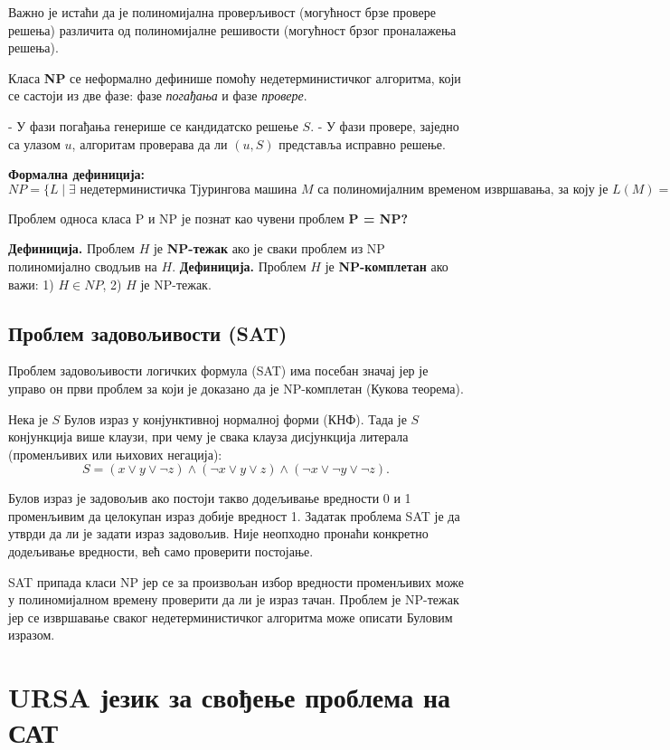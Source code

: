 \documentclass[12pt,oneside]{memoir}
\begin{document}
Важно је истаћи да је полиномијална проверљивост (могућност брзе провере решења) различита од полиномијалне решивости (могућност брзог проналажења решења).  

Класа \textbf{NP} се неформално дефинише помоћу недетерминистичког алгоритма, који се састоји из две фазе: фазе \textit{погађања} и фазе \textit{провере}.  

- У фази погађања генерише се кандидатско решење $S$.  
- У фази провере, заједно са улазом $u$, алгоритам проверава да ли $(u,S)$ представља исправно решење.  

\textbf{Формална дефиниција:}
\[
NP = \{ L \mid \exists \text{ недетерминистичка Тјурингова машина } M \text{ са полиномијалним временом извршавања, за коју је } L(M) = L \}.
\]

Проблем односа класа P и NP је познат као чувени проблем \textbf{P = NP?}  

\textbf{Дефиниција.} Проблем $H$ је \textbf{NP-тежак} ако је сваки проблем из NP полиномијално сводљив на $H$.  
\textbf{Дефиниција.} Проблем $H$ је \textbf{NP-комплетан} ако важи:  
1) $H \in NP$,  
2) $H$ је NP-тежак.  

\subsection{Проблем задовољивости (SAT)}
Проблем задовољивости логичких формула (SAT) има посебан значај јер је управо он први проблем за који је доказано да је NP-комплетан (Кукова теорема).  

Нека је $S$ Булов израз у конјунктивној нормалној форми (КНФ). Тада је $S$ конјункција више клаузи, при чему је свака клауза дисјункција литерала (променљивих или њихових негација):  
\[
S = (x \lor y \lor \lnot z) \land (\lnot x \lor y \lor z) \land (\lnot x \lor \lnot y \lor \lnot z).
\]

Булов израз је задовољив ако постоји такво додељивање вредности 0 и 1 променљивим да целокупан израз добије вредност 1. Задатак проблема SAT је да утврди да ли је задати израз задовољив. Није неопходно пронаћи конкретно додељивање вредности, већ само проверити постојање.  

SAT припада класи NP јер се за произвољан избор вредности променљивих може у полиномијалном времену проверити да ли је израз тачан. Проблем је NP-тежак јер се извршавање сваког недетерминистичког алгоритма може описати Буловим изразом.  



\section{URSA језик за свођење проблема на САТ}
\end{document}
